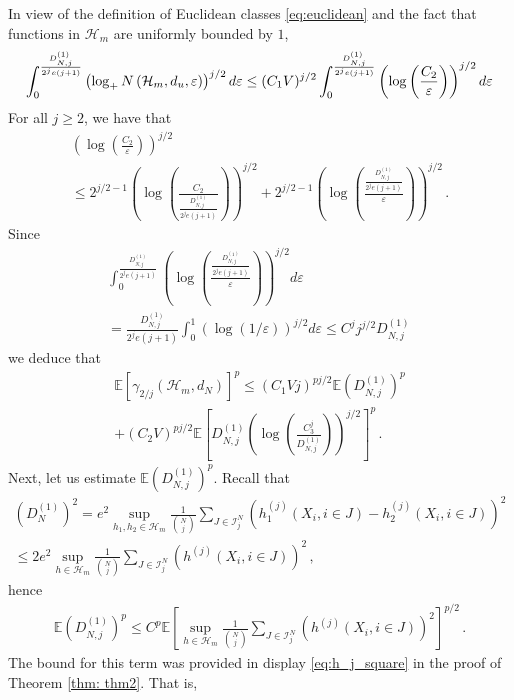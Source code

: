 \documentclass[12pt]{article}
\def\l{\left}
\def\r{\right}
\newcommand{\mb}{\mathbb}
\theoremstyle{thmstyletwo}%
\theoremstyle{thmstylethree}%
\begin{document}
In view of the definition of Euclidean classes \eqref{eq:euclidean} and the fact that functions in $\mathcal{H}_m$ are uniformly bounded by $1$, 
\begin{equation*}
    \int_0^{\frac{D_{N,j}^{(1)}}{2^je(j+1)}} \l(\log_+ N\l(\mathcal{H}_m, d_u, \varepsilon \r) \r)^{j/2} d\varepsilon 
    \\
    \leq (C_1V)^{j/2} \int_0^{\frac{D_{N,j}^{(1)}}{2^je(j+1)}} \l(\log \l(\frac{C_2}{\varepsilon}\r) \r)^{j/2} d\varepsilon
\end{equation*}
For all $j \geq 2$, we have that 
\begin{multline*}
    \l(\log \l(\frac{C_2 }{\varepsilon}\r) \r)^{j/2} \\
    \leq 2^{j/2-1}\l(\log \l(\frac{C_2 }{\frac{D_{N,j}^{(1)}}{2^je(j+1)}}\r) \r)^{j/2} + 2^{j/2-1}\l(\log \l(\frac{\frac{D_{N,j}^{(1)}}{2^je(j+1)}}{\varepsilon}\r) \r)^{j/2}\,.
\end{multline*}
Since
\begin{multline*}
    \int_0^{\frac{D_{N,j}^{(1)}}{2^je(j+1)}} \l(\log \l(\frac{\frac{D_{N,j}^{(1)}}{2^je(j+1)}}{\varepsilon}\r) \r)^{j/2} d\varepsilon \\
    = \frac{D_{N,j}^{(1)}}{2^je(j+1)} \int_0^1 \l(\log(1/\varepsilon)\r)^{j/2} d\varepsilon \leq C^jj^{j/2} D_{N,j}^{(1)}\,
\end{multline*}
we deduce that 
\begin{multline*}
\mb E \l[ \gamma_{2/j} (\mathcal{H}_m, d_N) \r]^p \leq \l(C_1 Vj\r)^{pj/2} \mb E \l(D_{N,j}^{(1)}\r)^p 
\\
+ (C_2 V)^{pj/2} \mb E \l[D_{N,j}^{(1)} \l(\log\l(\frac{C_3^j}{D_{N,j}^{(1)}}\r)\r)^{j/2}\r]^p\,.
\end{multline*}
Next, let us estimate $\mb E \l(D_{N,j}^{(1)}\r)^p$. Recall that 
\begin{multline*}
    \l(D_N^{(1)}\r)^2 = e^2\sup_{h_1, h_2 \in \mathcal{H}_m}  \frac{1}{{N \choose j}}\sum_{J \in \mathcal{I}^N_j} \l(h^{(j)}_1 \l(X_i, i \in J\r) - h^{(j)}_2 \l(X_i, i \in J\r)\r)^2 \\
    \leq 2e^2\sup_{h \in \mathcal{H}_m}  \frac{1}{{N \choose j}}\sum_{J \in \mathcal{I}^N_j} \l(h^{(j)} \l(X_i, i \in J\r)\r)^2 \,,
\end{multline*}
hence
\begin{align*}
    \mb E \l(D_{N,j}^{(1)}\r)^p \leq C^p \mb E \l[\sup_{h \in \mathcal{H}_m}  \frac{1}{{N \choose j}}\sum_{J \in \mathcal{I}^N_j} \l(h^{(j)} \l(X_i, i \in J\r)\r)^2\r]^{p/2}\,.
\end{align*}
The bound for this term was provided in display \eqref{eq:h_j_square} in the proof of Theorem \ref{thm: thm2}. That is,
\end{document}
